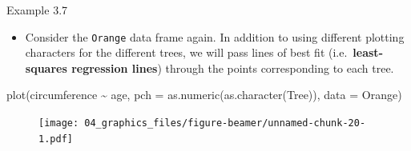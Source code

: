 \documentclass[
  9pt,
  a4paper,
  ignorenonframetext,
  notheorems]{beamer}
\newenvironment{Shaded}{\begin{snugshade}}{\end{snugshade}}
\newcommand{\AttributeTok}[1]{\textcolor[rgb]{0.40,0.45,0.13}{#1}}
\newcommand{\FunctionTok}[1]{\textcolor[rgb]{0.28,0.35,0.67}{#1}}
\newcommand{\NormalTok}[1]{\textcolor[rgb]{0.00,0.23,0.31}{#1}}
\newcommand{\SpecialCharTok}[1]{\textcolor[rgb]{0.37,0.37,0.37}{#1}}
\providecommand{\tightlist}{%
  \setlength{\itemsep}{0pt}\setlength{\parskip}{0pt}}\usepackage{longtable,booktabs,array}
\begin{document}
\begin{frame}[fragile]
\begin{block}{Example 3.7}
\protect\hypertarget{example-3.7}{}
\begin{itemize}
\tightlist
\item
  Consider the \texttt{Orange} data frame again. In addition to using
  different plotting characters for the different trees, we will pass
  lines of best fit (i.e.~\textbf{least-squares regression lines})
  through the points corresponding to each tree.
\end{itemize}

\begin{Shaded}
\begin{Highlighting}[]
\FunctionTok{plot}\NormalTok{(circumference }\SpecialCharTok{\textasciitilde{}}\NormalTok{ age, }\AttributeTok{pch =} \FunctionTok{as.numeric}\NormalTok{(}\FunctionTok{as.character}\NormalTok{(Tree)), }\AttributeTok{data =}\NormalTok{ Orange)}
\end{Highlighting}
\end{Shaded}

\begin{figure}

{\centering \texttt{[image: 04\_graphics\_files/figure-beamer/unnamed-chunk-20-1.pdf]}

}

\end{figure}
\end{block}
\end{frame}
\end{document}

